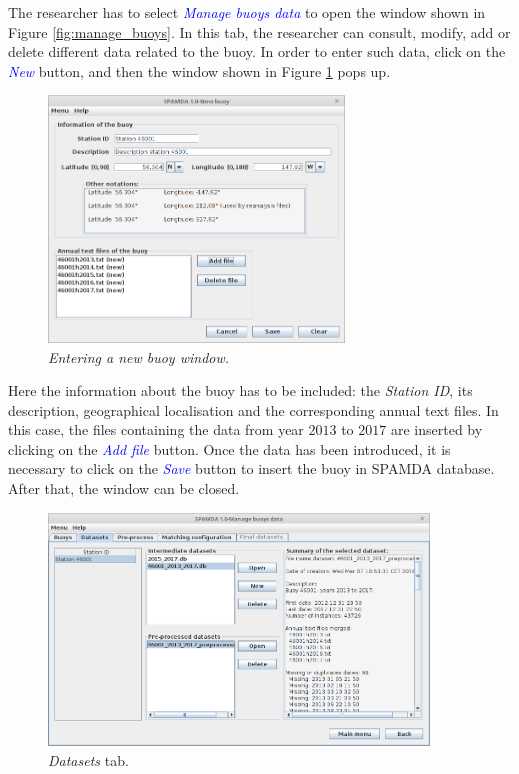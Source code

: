 \documentclass[review]{elsarticle}
\begin{document}
		The researcher has to select \textcolor{blue}{\textit{Manage buoys data}} to open the window shown in Figure \ref{fig:manage_buoys}. In this tab, the researcher can consult, modify, add or delete different data related to the buoy. In order to enter such data, click on the \textcolor{blue}{\textit{New}} button, and then the window shown in Figure \ref{fig:new_buoy} pops up.
		
		\begin{figure}[ht!]
			\centering
			\includegraphics[width=0.70\textwidth]{figures/FigureNew_buoy.png}
			\caption{\em{Entering a new buoy} window.}\label{fig:new_buoy}
		\end{figure}
		
		Here the information about the buoy has to be included: the \textit{Station ID}, its description, geographical localisation and the corresponding annual text files. In this case, the files containing the data from year $2013$ to $2017$ are inserted by clicking on the \textcolor{blue}{\textit{Add file}} button. Once the data has been introduced, it is necessary to click on the \textcolor{blue}{\textit{Save}} button to insert the buoy in SPAMDA database. After that, the window can be closed.  
		
		\begin{figure}[ht!]
			\centering
			\includegraphics[width=0.90\textwidth]{figures/FigureDatasets.png}
			\caption{\textit{Datasets} tab.}\label{fig:show_datasets}
		\end{figure}
		
\end{document}

